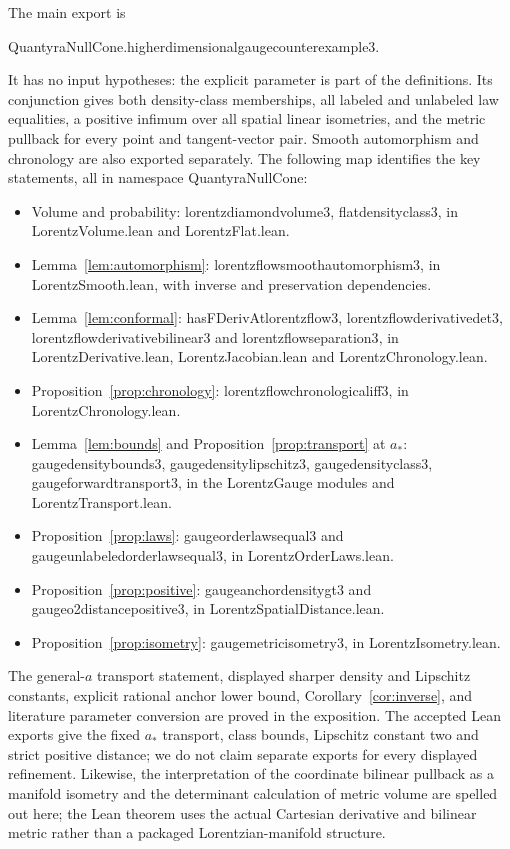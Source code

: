 \documentclass[11pt]{article}
\theoremstyle{remark}
\newcommand{\code}[1]{{\small\ttfamily\def\_{\textunderscore\allowbreak}#1}}
\begin{document}
The main export is
\begin{center}
\code{QuantyraNullCone.higher\_dimensional\_gauge\_counterexample3}.
\end{center}
It has no input hypotheses: the explicit parameter is part of the
definitions. Its conjunction gives both density-class memberships,
all labeled and unlabeled law equalities, a positive infimum over
all spatial linear isometries, and the metric pullback for every
point and tangent-vector pair. Smooth automorphism and chronology
are also exported separately. The following map identifies the key
statements, all in namespace \code{QuantyraNullCone}:
\begin{itemize}
\raggedright
\item Volume and probability: \code{lorentz\_diamond\_volume3},
\code{flat\_density\_class3}, in \code{LorentzVolume.lean} and
\code{LorentzFlat.lean}.
\item Lemma~\ref{lem:automorphism}: \code{lorentz\_flow\_smooth\_automorphism3},
in \code{LorentzSmooth.lean}, with inverse and preservation dependencies.
\item Lemma~\ref{lem:conformal}: \code{hasFDerivAt\_lorentz\_flow3},
\code{lorentz\_flow\_derivative\_det3},
\code{lorentz\_flow\_derivative\_bilinear3} and
\code{lorentz\_flow\_separation3}, in \code{LorentzDerivative.lean},
\code{LorentzJacobian.lean} and \code{LorentzChronology.lean}.
\item Proposition~\ref{prop:chronology}: \code{lorentz\_flow\_chronological\_iff3},
in \code{LorentzChronology.lean}.
\item Lemma~\ref{lem:bounds} and Proposition~\ref{prop:transport} at $a_*$:
\code{gauge\_density\_bounds3}, \code{gauge\_density\_lipschitz3},
\code{gauge\_density\_class3}, \code{gauge\_forward\_transport3},
in the \code{LorentzGauge} modules and \code{LorentzTransport.lean}.
\item Proposition~\ref{prop:laws}: \code{gauge\_order\_laws\_equal3} and
\code{gauge\_unlabeled\_order\_laws\_equal3}, in \code{LorentzOrderLaws.lean}.
\item Proposition~\ref{prop:positive}: \code{gauge\_anchor\_density\_gt3} and
\code{gauge\_o2\_distance\_positive3}, in \code{LorentzSpatialDistance.lean}.
\item Proposition~\ref{prop:isometry}: \code{gauge\_metric\_isometry3},
in \code{LorentzIsometry.lean}.
\end{itemize}

The general-$a$ transport statement, displayed sharper density and
Lipschitz constants, explicit rational anchor lower bound,
Corollary~\ref{cor:inverse}, and literature parameter conversion are
proved in the exposition. The accepted Lean exports give the fixed
$a_*$ transport, class bounds, Lipschitz constant two and strict positive
distance; we do not claim separate exports for every displayed refinement.
Likewise, the interpretation of the coordinate bilinear pullback as a
manifold isometry and the determinant calculation of metric volume are
spelled out here; the Lean theorem uses the actual Cartesian derivative
and bilinear metric rather than a packaged Lorentzian-manifold structure.
\end{document}
